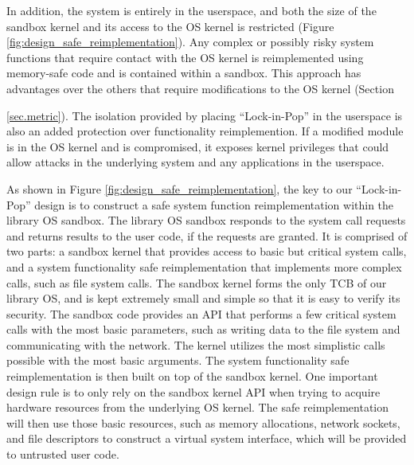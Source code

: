 In addition, the system is entirely in the userspace, and both the size of 
the sandbox kernel and its access to the OS kernel is restricted
(Figure \ref{fig:design_safe_reimplementation}). Any complex or possibly risky system
functions that require contact with the OS kernel is reimplemented using
memory-safe code and is contained within a sandbox. This approach has advantages
over the others that require modifications to
the OS kernel (Section {\ref{sec.metric}). The isolation provided by placing
``Lock-in-Pop'' in the userspace is also an added protection over functionality
reimplemention. If a modified module is in the OS kernel and is compromised, it
exposes kernel privileges that could allow attacks 
in the underlying system and any applications in the userspace.

As shown in Figure \ref{fig:design_safe_reimplementation}, the key to our 
``Lock-in-Pop'' design is to construct a safe system function reimplementation within 
the library OS sandbox. 
The library OS sandbox responds to the system call requests and
returns results to the user code, if the requests are granted.
It is comprised of two parts: a sandbox kernel that provides access to basic but critical
system calls, and a system functionality safe reimplementation that implements more
complex calls, such as file system calls. 
The sandbox kernel forms the only TCB of our library OS, and is kept
extremely small and simple so that it is easy to verify its security.
The sandbox code provides an API that performs a few critical system calls with
the most basic parameters, such as writing data to the file system
and communicating with the network. The kernel utilizes the most simplistic calls
possible with the most basic arguments. The system functionality safe reimplementation 
is then built on top of the sandbox kernel. One important design rule is to only rely on the 
sandbox kernel API when trying to acquire hardware resources from the underlying OS kernel. 
The safe reimplementation will then use those basic resources, such as memory allocations, 
network sockets, and file descriptors to construct a virtual system interface, which will be 
provided to untrusted user code. 

}
